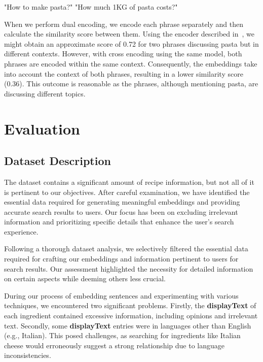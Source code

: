 \documentclass[runningheads]{llncs}
\begin{document}
\hspace{0.5cm} %
\begin{minipage}{1.2\textwidth} %
\begin{dialogue}
 "How to make pasta?"
 "How much 1KG of pasta costs?"\\[5pt]
\end{dialogue}
\end{minipage}

When we perform dual encoding, we encode each phrase separately and then calculate the similarity score between them. Using the encoder described in~\cite{reimers-2019-sentence-bert}, we might obtain an approximate score of 0.72 for two phrases discussing pasta but in different contexts. However, with cross encoding using the same model, both phrases are encoded within the same context. Consequently, the embeddings take into account the context of both phrases, resulting in a lower similarity score (0.36). This outcome is reasonable as the phrases, although mentioning pasta, are discussing different topics.
\section{Evaluation}
\subsection{Dataset Description}
The dataset contains a significant amount of recipe information, but not all of it is pertinent to our objectives. After careful examination, we have identified the essential data required for generating meaningful embeddings and providing accurate search results to users. Our focus has been on excluding irrelevant information and prioritizing specific details that enhance the user's search experience.

Following a thorough dataset analysis, we selectively filtered the essential data required for crafting our embeddings and information pertinent to users for search results. Our assessment highlighted the necessity for detailed information on certain aspects while deeming others less crucial.

During our process of embedding sentences and experimenting with various techniques, we encountered two significant problems. Firstly, the \textbf{displayText} of each ingredient contained excessive information, including opinions and irrelevant text. Secondly, some \textbf{displayText} entries were in languages other than English (e.g., Italian). This posed challenges, as searching for ingredients like Italian cheese would erroneously suggest a strong relationship due to language inconsistencies.
\end{document}
